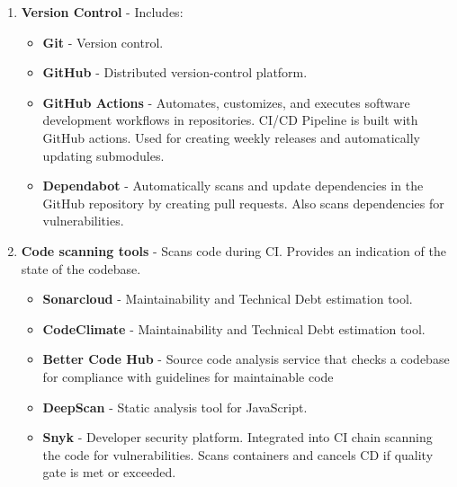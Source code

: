 \begin{enumerate}
    \item \textbf{Version Control} - Includes:
    \begin{itemize}
        \item \textbf{Git} - Version control.
        \item \textbf{GitHub} - Distributed version-control platform.
        \item \textbf{GitHub Actions} - Automates, customizes, and executes software development workflows in repositories. CI/CD Pipeline is built with GitHub actions. Used for creating weekly releases and automatically updating submodules.
        \item \textbf{Dependabot} - Automatically scans and update dependencies in the GitHub repository by creating pull requests. Also scans dependencies for vulnerabilities.
    \end{itemize}
    
    \item \textbf{Code scanning tools} - Scans code during CI. Provides an indication of the state of the codebase.
    \begin{itemize}
        \item \textbf{Sonarcloud} - Maintainability and Technical Debt estimation tool.
        \item \textbf{CodeClimate} -  Maintainability and Technical Debt estimation tool.
        \item \textbf{Better Code Hub} -  Source code analysis service that checks a codebase for compliance with guidelines for maintainable code
        \item \textbf{DeepScan} - Static analysis tool for JavaScript.
        \item \textbf{Snyk} - Developer security platform. Integrated into CI chain scanning the code for vulnerabilities. Scans containers and cancels CD if quality gate is met or exceeded.
    \end{itemize}
    

\end{enumerate}
